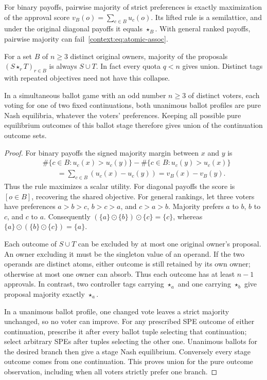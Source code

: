 \begin{proposition}\label{context:prop:majority}
For binary payoffs, pairwise majority of strict preferences is exactly
maximization of the approval score $v_B(o)=\sum_{c\in B}u_c(o)$.
Its lifted rule is a semilattice, and under the original diagonal
payoffs it equals $\star_B$. With general ranked payoffs, pairwise
majority can fail~\eqref{context:eq:atomic-assoc}.

For a set $B$ of $n\geq3$ distinct original owners, majority of the
proposals $(S\star_r T)_{r\in B}$ is always $S\cup T$. In fact
every quota $q<n$ gives union. Distinct tags with repeated objectives
need not have this collapse.

In a simultaneous ballot game with an odd number $n\geq3$ of distinct voters,
each voting for one of two fixed continuations, both unanimous ballot
profiles are pure Nash equilibria, whatever the voters' preferences.
Keeping all possible pure equilibrium outcomes of this ballot stage
therefore gives union of the continuation outcome sets.
\end{proposition}
\begin{proof}
For binary payoffs the signed majority margin between $x$ and $y$ is
\begin{align*}
 &\#\{c\in B:u_c(x)>u_c(y)\}-\#\{c\in B:u_c(y)>u_c(x)\}\\
 &\qquad=\sum_{c\in B}(u_c(x)-u_c(y))=v_B(x)-v_B(y).
\end{align*}
Thus the rule maximizes a scalar utility. For diagonal payoffs the
score is $[o\in B]$, recovering the shared objective.
For general rankings, let three voters have preferences
$a>b>c$, $b>c>a$, and $c>a>b$. Majority prefers $a$ to $b$, $b$ to
$c$, and $c$ to $a$. Consequently
$(\{a\}\odot\{b\})\odot\{c\}=\{c\}$, whereas
$\{a\}\odot(\{b\}\odot\{c\})=\{a\}$.

Each outcome of $S\cup T$ can be excluded by at most one original
owner's proposal. An owner excluding it must be the singleton value
of an operand. If the two operands are distinct atoms, either outcome
is still retained by its own owner; otherwise at most one owner can
absorb. Thus each outcome has at least $n-1$ approvals. In contrast,
two controller tags carrying $\star_a$ and one carrying $\star_b$
give proposal majority exactly $\star_a$.

In a unanimous ballot profile, one changed vote leaves a strict
majority unchanged, so no voter can improve. For any prescribed SPE
outcome of either continuation, prescribe it after every ballot tuple
selecting that continuation; select arbitrary SPEs after tuples
selecting the other one. Unanimous ballots for the desired branch
then give a stage Nash equilibrium. Conversely every stage outcome
comes from one continuation. This proves union for the pure outcome
observation, including when all voters strictly prefer one branch.
\end{proof}

